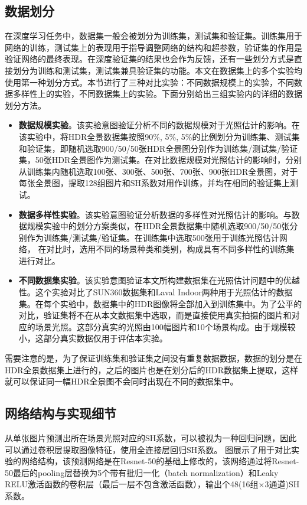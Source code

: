 \subsection{数据划分}
在深度学习任务中，数据集一般会被划分为训练集，测试集和验证集。训练集用于网络的训练，测试集上的表现用于指导调整网络的结构和超参数，验证集的作用是验证网络的最终表现。在深度验证集的结果也会作为反馈，还有一些划分方式是直接划分为训练和测试集，测试集兼具验证集的功能。本文在数据集上的多个实验均使用第一种划分方式。本节进行了三种对比实验：不同数据规模上的实验，不同数据多样性上的实验，不同数据集上的实验。下面分别给出三组实验内的详细的数据划分方法。
\begin{itemize}
    \item \textbf{数据规模实验}。该实验意图验证分析不同的数据规模对于光照估计的影响。在该实验中，将HDR全景数据集按照90\%, 5\%, 5\%的比例划分为训练集、测试集和验证集，即随机选取900/50/50张HDR全景图分别作为训练集/测试集/验证集，50张HDR全景图作为测试集。在对比数据规模对光照估计的影响时，分别从训练集内随机选取100张、300张、500张、700张、900张HDR全景图，对于每张全景图，提取128组图片和SH系数对用作训练，并均在相同的验证集上测试。
    \item \textbf{数据多样性实验}。该实验意图验证分析数据的多样性对光照估计的影响。与数据规模实验中的划分方案类似，在HDR全景数据集中随机选取900/50/50张分别作为训练集/测试集/验证集。在训练集中选取500张用于训练光照估计网络， 在对比时，选用不同的场景种类和类别，构成具有不同多样性的训练集进行对比。
    \item \textbf{不同数据集实验}。该实验意图验证本文所构建数据集在光照估计问题中的优越性。这个实验对比了SUN360\cite{xiao2012recognizing}数据集和Laval Indoor\cite{gardner2017learning}两种用于光照估计的数据集。在每个实验中，数据集中的HDR图像将全部加入到训练集中。为了公平的对比，验证集将不在从本文数据集中选取，而是直接使用真实拍摄的图片和对应的场景光照。这部分真实的光照由100幅图片和10个场景构成。由于规模较小，这部分真实数据仅用于评估本实验。
\end{itemize}

需要注意的是，为了保证训练集和验证集之间没有重复数据数据，数据的划分是在HDR全景数据集上进行的，之后的图片也是在划分后的HDR数据集上提取，这样就可以保证同一幅HDR全景图不会同时出现在不同的数据集中。
\subsection{网络结构与实现细节}
从单张图片预测出所在场景光照对应的SH系数，可以被视为一种回归问题，因此可以通过卷积层提取图像特征，使用全连接层回归SH系数。
图展示了用于对比实验的网络结构，该预测网络是在Resnet-50\cite{he2016deep}的基础上修改的，该网络通过将Resnet-50最后的pooling层替换为5个带有批归一化（batch normalization）\cite{ioffe2015batch}和Leaky RELU激活函数\cite{maas2013rectifier}的卷积层（最后一层不包含激活函数），输出个48(16组$\times$3通道)SH系数。

